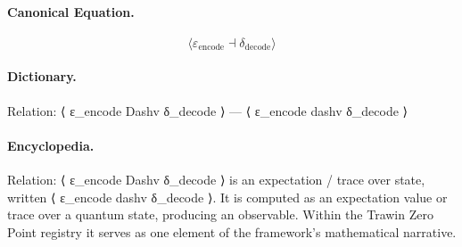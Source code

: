 \paragraph{Canonical Equation.}
\[
\langle \varepsilon_{\text{encode}} \dashv \delta_{\text{decode}} \rangle
\]

\paragraph{Dictionary.}
Relation: ⟨ ε\_encode Dashv δ\_decode ⟩ — ⟨ ε\_encode dashv δ\_decode ⟩

\paragraph{Encyclopedia.}
Relation: ⟨ ε\_encode Dashv δ\_decode ⟩ is an expectation / trace over state, written ⟨ ε\_encode dashv δ\_decode ⟩. It is computed as an expectation value or trace over a quantum state, producing an observable. Within the Trawin Zero Point registry it serves as one element of the framework's mathematical narrative.
